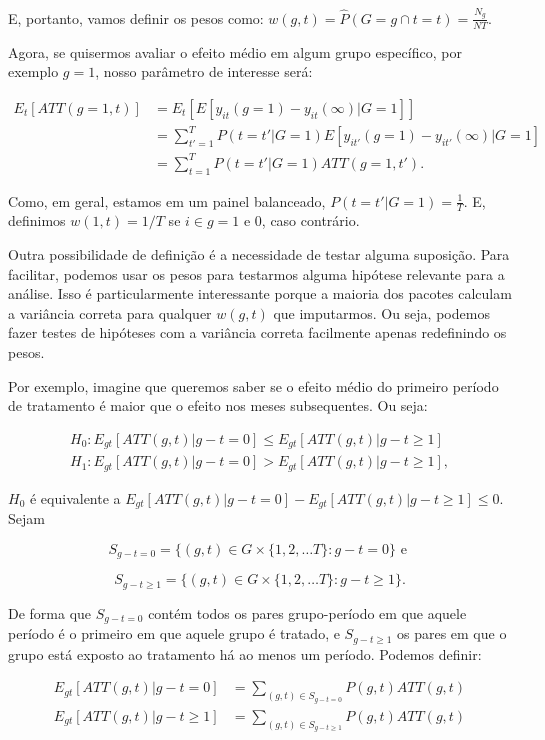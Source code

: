 \documentclass[portugues]{article}
\begin{document}
\noindent E, portanto, vamos definir os pesos como: $w(g,t) = \hat{P}(G=g \cap t=t) = \frac{N_g}{NT}$. 

Agora, se quisermos avaliar o efeito médio em algum grupo específico, por exemplo $g=1$, nosso parâmetro de interesse será:

\[
\begin{split}
    E_t[ATT(g=1,t)] &=  E_t[E[y_{it}(g=1) - y_{it}(\infty)|G=1]] \\
    &= \sum_{t'=1}^{T} P(t=t'|G=1) E[y_{it'}(g=1) - y_{it'}(\infty)|G=1] \\
    &=  \sum_{t=1}^{T} P(t=t'|G=1) ATT(g=1,t').
\end{split}
\]

\noindent Como, em geral, estamos em um painel balanceado, $P(t=t'|G=1) = \frac{1}{T}$. E, definimos $w(1,t) = 1/T$ se $i \in g=1$ e 0, caso contrário.

Outra possibilidade de definição é a necessidade de testar alguma suposição. Para facilitar, podemos usar os pesos para testarmos alguma hipótese relevante para a análise. Isso é particularmente interessante porque a maioria dos pacotes calculam a variância correta para qualquer $w(g,t)$ que imputarmos. Ou seja, podemos fazer testes de hipóteses com a variância correta facilmente apenas redefinindo os pesos.

Por exemplo, imagine que queremos saber se o efeito médio do primeiro período de tratamento é maior que o efeito nos meses subsequentes. Ou seja:

\[
\begin{split}
    H_0: E_{gt}[ATT(g,t)| g - t = 0] \leq E_{gt}[ATT(g,t)|g-t \geq 1] \\
    H_1: E_{gt}[ATT(g,t)| g - t = 0] > E_{gt}[ATT(g,t)|g-t \geq 1],
\end{split}
\]

\noindent $H_0$ é equivalente a $ E_{gt}[ATT(g,t)| g - t = 0] - E_{gt}[ATT(g,t)|g-t \geq 1] \leq 0$. Sejam 

$$S_{g-t=0} = \{(g,t) \in G \times \{1, 2, \dots T\}: g-t=0\} \text{ e }$$

$$ S_{g-t \geq 1} = \{(g,t) \in G \times \{1, 2, \dots T\}: g-t\geq 1\}. $$

\noindent De forma que $S_{g-t=0}$ contém todos os pares grupo-período em que aquele período é o primeiro em que aquele grupo é tratado, e $S_{g-t \geq1}$ os pares em que o grupo está exposto ao tratamento há ao menos um período. Podemos definir:

\[
\begin{split}
    E_{gt}[ATT(g,t)| g - t = 0] &= \sum_{(g,t) \in S_{g-t=0}} P(g,t) ATT(g,t) \\
    E_{gt}[ATT(g,t)| g - t \geq 1] &= \sum_{(g,t) \in S_{g-t\geq 1}} P(g,t) ATT(g,t) \\
\end{split}
\]
\end{document}

